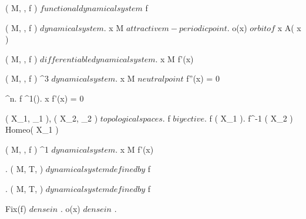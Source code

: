 \documentclass[../Main/main]{subfiles}
\begin{document}
{	
	{
		{
			( M, \N, f ) $ functional dynamical system $
		}
		{
		}
		\denote
		{
			f \as \chi
		}
	}
	
	
	{
		{
			( M, \N, f ) $ dynamical system $.
			x \in M $ attractive m-periodic point $.
			o(x) $ orbit of $ x
		}
		{
		}
		\denote
		{
			A( x )
		}
	}
	
	
	{
		{
			( M, \N, f ) $ differentiable dynamical system $.
			x \in M
		}
		{
			f'(x) \in {}
		}
	}


	{
		{
			( M, \N, f ) \hspace{5pt} \Cc^3 $ dynamical system $.
			x \in M $ neutral point $
		}
		{
			f''(x) = 0
		}
	}
	

	{
		{
			\Uc \subset \R^n.
			f \in \Cc^1(\Uc).
			x \in \Uc
		}
		{
			f'(x) = 0
		}
	}

	
	{
		{
			( X_1, \tau_1 ), ( X_2, \tau_2 ) $ topological spaces $.
		}
		{
			f $ biyective $.
			f \in \Cc( X_1 ).
			f^{-1} \in \Cc( X_2 )			
		}
		\denote
		{
			 \as Homeo( X_1 )
		}
	}
	
	
	
	
	{
		{
			( M, \N, f ) \Cc^1 $ dynamical system $.
			x \in M
		}
		{
			f'(x)
		}
	}
	
	
	{
		{
			.
			( M, T, \phi ) $ dynamical system defined by $ f
		}
		{
			{
			}
		}
	}
	
	
	{
		{
			.
			( M, T, \phi ) $ dynamical system defined by $ f
		}
		{
			Fix(f) $ dense in $ \R.
			{
				o(x) $ dense in $ \R
			}.

}}}
\end{document}

